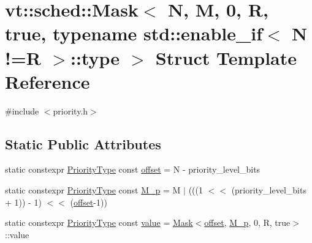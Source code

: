 \hypertarget{structvt_1_1sched_1_1_mask_3_01_n_00_01_m_00_010_00_01_r_00_01true_00_01typename_01std_1_1enable84a8b0b373fb69b0fca50672234c2a86}{}\section{vt\+:\+:sched\+:\+:Mask$<$ N, M, 0, R, true, typename std\+:\+:enable\+\_\+if$<$ N !=R $>$\+:\+:type $>$ Struct Template Reference}
\label{structvt_1_1sched_1_1_mask_3_01_n_00_01_m_00_010_00_01_r_00_01true_00_01typename_01std_1_1enable84a8b0b373fb69b0fca50672234c2a86}


{\ttfamily \#include $<$priority.\+h$>$}

\subsection*{Static Public Attributes}
\begin{DoxyCompactItemize}
\item 
static constexpr \hyperlink{namespacevt_a86bff9f556eb761b27fc8600d006ac04}{Priority\+Type} const \hyperlink{structvt_1_1sched_1_1_mask_3_01_n_00_01_m_00_010_00_01_r_00_01true_00_01typename_01std_1_1enable84a8b0b373fb69b0fca50672234c2a86_a135ff903440365afaf87ffb49e822820}{offset} = N -\/ priority\+\_\+level\+\_\+bits
\item 
static constexpr \hyperlink{namespacevt_a86bff9f556eb761b27fc8600d006ac04}{Priority\+Type} const \hyperlink{structvt_1_1sched_1_1_mask_3_01_n_00_01_m_00_010_00_01_r_00_01true_00_01typename_01std_1_1enable84a8b0b373fb69b0fca50672234c2a86_ac7b7308185e80b997833fc8575384ea0}{M\+\_\+p} = M $\vert$ (((1 $<$$<$ (priority\+\_\+level\+\_\+bits + 1)) -\/ 1) $<$$<$ (\hyperlink{structvt_1_1sched_1_1_mask_3_01_n_00_01_m_00_010_00_01_r_00_01true_00_01typename_01std_1_1enable84a8b0b373fb69b0fca50672234c2a86_a135ff903440365afaf87ffb49e822820}{offset}-\/1))
\item 
static constexpr \hyperlink{namespacevt_a86bff9f556eb761b27fc8600d006ac04}{Priority\+Type} const \hyperlink{structvt_1_1sched_1_1_mask_3_01_n_00_01_m_00_010_00_01_r_00_01true_00_01typename_01std_1_1enable84a8b0b373fb69b0fca50672234c2a86_a9b04f95f8b193e0b8f6e09ad2e580c4a}{value} = \hyperlink{structvt_1_1sched_1_1_mask}{Mask}$<$\hyperlink{structvt_1_1sched_1_1_mask_3_01_n_00_01_m_00_010_00_01_r_00_01true_00_01typename_01std_1_1enable84a8b0b373fb69b0fca50672234c2a86_a135ff903440365afaf87ffb49e822820}{offset}, \hyperlink{structvt_1_1sched_1_1_mask_3_01_n_00_01_m_00_010_00_01_r_00_01true_00_01typename_01std_1_1enable84a8b0b373fb69b0fca50672234c2a86_ac7b7308185e80b997833fc8575384ea0}{M\+\_\+p}, 0, R, true$>$\+::value
\end{DoxyCompactItemize}



